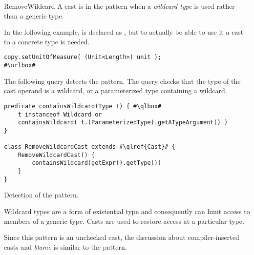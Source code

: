 \begin{pattern}{RemoveWildcard}
A cast is in the \thisp{} pattern when a \emph{wildcard type} is used rather than a generic type.


\instances{}
In the following example,%
\def\urlvar{http://bit.ly/eclipse_jetty_project_2WMI0Ld}
 is declared as ,
but to actually be able to use it a cast to a concrete type is needed.

\begin{verbatim}
copy.setUnitOfMeasure( (Unit<Length>) unit );
#\urlbox#
\end{verbatim}


\detection{}
The following query detects the \thisp{} pattern.
The query checks that the type of the cast operand is a wildcard,
or a parameterized type containing a wildcard.

\begin{listing}
\begin{verbatim}
predicate containsWildcard(Type t) { #\qlbox#
	t instanceof Wildcard or
	containsWildcard( t.(ParameterizedType).getATypeArgument() )
}

class RemoveWildcardCast extends #\qlref{Cast}# {
	RemoveWildcardCast() {
		containsWildcard(getExpr().getType())
	}
}
\end{verbatim}
\caption{Detection of the \thisp{} pattern.}
\label{lst:ql:RemoveWildcardCast}
\end{listing}


\issues{}
Wildcard types are a form of existential type and consequently can limit
access to members of a generic type.
Casts are used to restore access at a particular type.

Since this pattern is an unchecked cast,
the discussion about compiler-inserted casts and \emph{blame} is similar to the  pattern.

\end{pattern}
